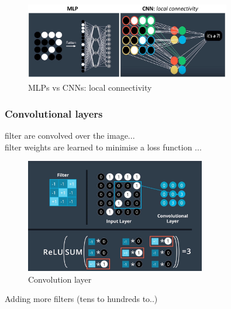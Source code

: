 \documentclass[11pt]{article}
\begin{document}
\begin{figure}[htbp] 
	\centering
	\includegraphics[width=0.8\textwidth]{pics/CNN_local_connectivity}
	\caption{MLPs vs CNNs: local connectivity} 
	\label{CNN_local_connectivity}
\end{figure}

\subsubsection{Convolutional layers}
filter are convolved over the image...\\
filter weights are learned to minimise a loss function ...\\
\begin{figure}[htbp] 
	\centering
	\includegraphics[width=0.7\textwidth]{pics/convolution_1}
	\caption{Convolution layer} 
	\label{convolution_1}
\end{figure}

Adding more filters (tens to hundreds to..) \\
\end{document}
